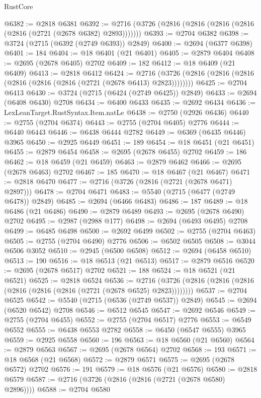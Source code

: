 \begin{lexlean}{RustCore}
\begin{coremodule}
@6382 := @2818 @6381
@6392 := @2716 (@3726 (@2816 (@2816 (@2816 (@2816 (@2816 (@2721 (@2678 @6382) @2893)))))))
@6393 := @2704 @6382
@6398 := @3724 (@2715 (@6392 (@2749 @6393)) @2849)
@6400 := @2694 (@6377 @6398)
@6401 := 184
@6404 := @18 @6401 (@21 @6401)
@6405 := @2879 @6404
@6408 := @2695 (@2678 @6405) @2702
@6409 := 182
@6412 := @18 @6409 (@21 @6409)
@6413 := @2818 @6412
@6424 := @2716 (@3726 (@2816 (@2816 (@2816 (@2816 (@2816 (@2816 (@2721 (@2678 @6413) @2823))))))))
@6425 := @2704 @6413
@6430 := @3724 (@2715 (@6424 (@2749 @6425)) @2849)
@6433 := @2694 (@6408 @6430) @2708
@6434 := @6400 @6433
@6435 := @2692 @6434
@6436 := LexLeanTarget.RustSyntax.Item.natLe
@6438 := @2750 (@2926 @6436)
@6440 := @2755 (@2704 @6374)
@6443 := @2755 (@2704 @6405) @2776
@6444 := @6440 @6443
@6446 := @6438 @6444 @2782
@6449 := @6369 (@6435 @6446) @3965
@6450 := @2925 @6449
@6451 := 189
@6454 := @18 @6451 (@21 @6451)
@6455 := @2879 @6454
@6458 := @2695 (@2678 @6455) @2702
@6459 := 186
@6462 := @18 @6459 (@21 @6459)
@6463 := @2879 @6462
@6466 := @2695 (@2678 @6463) @2702
@6467 := 185
@6470 := @18 @6467 (@21 @6467)
@6471 := @2818 @6470
@6477 := @2716 (@3726 (@2816 (@2721 (@2678 @6471) @2897)))
@6478 := @2704 @6471
@6483 := @5540 (@2715 (@6477 (@2749 @6478)) @2849)
@6485 := @2694 (@6466 @6483)
@6486 := 187
@6489 := @18 @6486 (@21 @6486)
@6490 := @2879 @6489
@6493 := @2695 (@2678 @6490) @2702
@6495 := @2987 (@2988 @177)
@6498 := @2694 (@6493 @6495) @2708
@6499 := @6485 @6498
@6500 := @2692 @6499
@6502 := @2755 (@2704 @6463)
@6505 := @2755 (@2704 @6490) @2776
@6506 := @6502 @6505
@6508 := @3044 @6506 @3052
@6510 := @2945 (@6500 @6508)
@6512 := @2694 (@6458 @6510)
@6513 := 190
@6516 := @18 @6513 (@21 @6513)
@6517 := @2879 @6516
@6520 := @2695 (@2678 @6517) @2702
@6521 := 188
@6524 := @18 @6521 (@21 @6521)
@6525 := @2818 @6524
@6536 := @2716 (@3726 (@2816 (@2816 (@2816 (@2816 (@2816 (@2816 (@2721 (@2678 @6525) @2823))))))))
@6537 := @2704 @6525
@6542 := @5540 (@2715 (@6536 (@2749 @6537)) @2849)
@6545 := @2694 (@6520 @6542) @2708
@6546 := @6512 @6545
@6547 := @2692 @6546
@6549 := @2755 (@2704 @6455)
@6552 := @2755 (@2704 @6517) @2776
@6553 := @6549 @6552
@6555 := @6438 @6553 @2782
@6558 := @6450 (@6547 @6555) @3965
@6559 := @2925 @6558
@6560 := 196
@6563 := @18 @6560 (@21 @6560)
@6564 := @2879 @6563
@6567 := @2695 (@2678 @6564) @2702
@6568 := 193
@6571 := @18 @6568 (@21 @6568)
@6572 := @2879 @6571
@6575 := @2695 (@2678 @6572) @2702
@6576 := 191
@6579 := @18 @6576 (@21 @6576)
@6580 := @2818 @6579
@6587 := @2716 (@3726 (@2816 (@2816 (@2721 (@2678 @6580) @2896))))
@6588 := @2704 @6580

\end{coremodule}
\end{lexlean}
